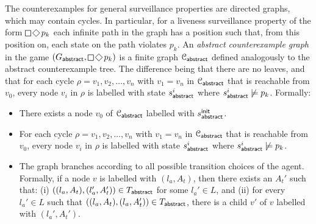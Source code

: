 The counterexamples for general surveillance properties are directed graphs, which may contain cycles. In particular, for a liveness surveillance property of the form $\LTLglobally\LTLfinally p_k$ each infinite path in the graph has a position such that, from this position on, each state on the path violates $p_k$. An \emph{abstract counterexample graph} in the game $(G_\abstr,\LTLglobally\LTLfinally p_k)$ is a finite graph $\mathcal{C}_{\mathsf{abstract}}$ defined analogously to the abstract counterexample tree. The difference being that there are no leaves, and that for each cycle $\rho = v_1,v_2,\ldots,v_n$ with $v_1 = v_n$ in $\mathcal{C}_{\mathsf{abstract}}$ that is reachable from $v_0$, every node $v_i$ in $\rho$ is labelled with state $s_{\mathsf{abstract}}^i$ where $s_{\mathsf{abstract}}^i \not\models p_k$. Formally:
\begin{itemize}
\item There exists a node $v_0$ of $\mathcal{C}_{\mathsf{abstract}}$ labelled with $s^{\mathsf{init}}_{\mathsf{abstract}}$.
\item For each cycle $\rho = v_1,v_2,\ldots,v_n$ with $v_1 = v_n$ in $\mathcal{C}_{\mathsf{abstract}}$ that is reachable from $v_0$, every node $v_i$ in $\rho$ is labelled with state $s_{\mathsf{abstract}}^i$ where $s_{\mathsf{abstract}}^i \not\models p_k$.
\item The graph branches according to all possible transition choices of the agent. Formally, if a node $v$ is labelled with $(l_a,A_t)$, then there exists an $A_t'$  such that: (i) $((l_a,A_t),(l_a',A_t')) \in T_{\mathsf{abstract}}$ for some $l_a' \in L$, and (ii) for every $l_a' \in L$ such that $((l_a,A_t),(l_a,A_t')) \in T_{\mathsf{abstract}}$, there is a child $v'$ of $v$ labelled with $(l_a',A_t')$.
\end{itemize}   

